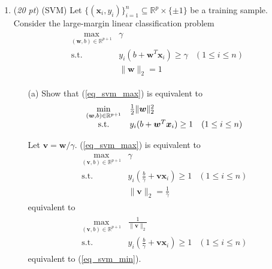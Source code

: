 \documentclass[10pt]{article}
\theoremstyle{definition}
\theoremstyle{remark}
\newcommand{\bv}{\bm{v}}
\newcommand{\bw}{\bm{w}}
\newcommand{\bx}{\bm{x}}
\newcommand{\bbR}{\mathbb{R}}
\newcommand{\st}{\mathrm{s.t.}}		%
\begin{document}
\begin{enumerate}
\begin{itemize}
	\end{itemize}

	\item (\textit{20 pt}) (SVM) Let $ \{ (\bx_{i},y_{i}) \}_{i=1}^{n} \subseteq \bbR^{p} \times \{ \pm 1 \} $ be a training sample. Consider the large-margin linear classification problem
	\begin{align}
	\begin{array}{cll}
	\max\limits_{(\bw,b) \in \bbR^{p+1}} & \gamma\\
	\st & y_{i}(b + \bw^{T}\bx_{i}) \ge \gamma & (1 \le i \le n)\\
	& \|\bw\|_{2} = 1
	\end{array}\label{eq_svm_max}
	\end{align}
	\begin{itemize}
		\item [(a)] Show that (\ref{eq_svm_max}) is equivalent to
		\begin{align}
			\begin{array}{cll}
			\min\limits_{(\bw,b) \in \bbR^{p+1}} & {1 \over 2}\|\bw\|_{2}^{2}\\
			\st & y_{i}(b + \bw^{T}\bx_{i}) \ge 1 & (1 \le i \le n)
			\end{array}\label{eq_svm_min}
		\end{align}
		
		Let $\bv = \bw/\gamma$. (\ref{eq_svm_max}) is equivalent to 
		\begin{align*}
	\begin{array}{cll}
	\max\limits_{(\bv,b) \in \bbR^{p+1}} & \gamma\\
	\st & y_{i}(\frac{b}{\gamma} + \bv\bx_{i}) \ge 1 & (1 \le i \le n)\\
	& \|\bv\|_{2} = \frac{1}{\gamma}
	\end{array}
	\end{align*}
	equivalent to 
	\begin{align*}
	\begin{array}{cll}
	\max\limits_{(\bv,b) \in \bbR^{p+1}} & \frac{1}{\|\bv\|_{2}} \\
	\st & y_{i}(\frac{b}{\gamma} + \bv\bx_{i}) \ge 1 & (1 \le i \le n)
	\end{array}
	\end{align*}
	equivalent to (\ref{eq_svm_min}).
		

\end{itemize}
\end{enumerate}
\end{document}
